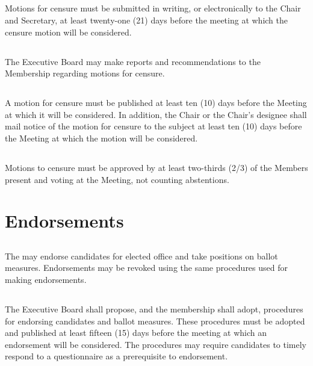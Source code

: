 \subsection{}
Motions for censure must be submitted in writing, or electronically to the Chair and Secretary, at least twenty-one (21) days before the meeting at which the censure motion will be considered.

\subsection{}
The Executive Board may make reports and recommendations to the Membership regarding motions for censure.

\subsection{}
A motion for censure must be published at least ten (10) days before the Meeting at which it will be considered. In addition, the Chair or the Chair’s designee shall mail notice of the motion for censure to the subject at least ten (10) days before the Meeting at which the motion will be considered.

\subsection{}
Motions to censure must be approved by at least two-thirds (2/3) of the Members present and voting at the Meeting, not counting abstentions.

\section{Endorsements}
\subsection{}
The \district{} may endorse candidates for elected office and take positions on ballot measures.  Endorsements may be revoked using the same procedures used for making endorsements.

\subsection{} \label{endorsement-procedures}
The Executive Board shall propose, and the membership shall adopt, procedures for endorsing candidates and ballot measures. These procedures must be adopted and published at least fifteen (15) days before the meeting at which an endorsement will be considered. The procedures may require candidates to timely respond to a questionnaire as a prerequisite to endorsement.

